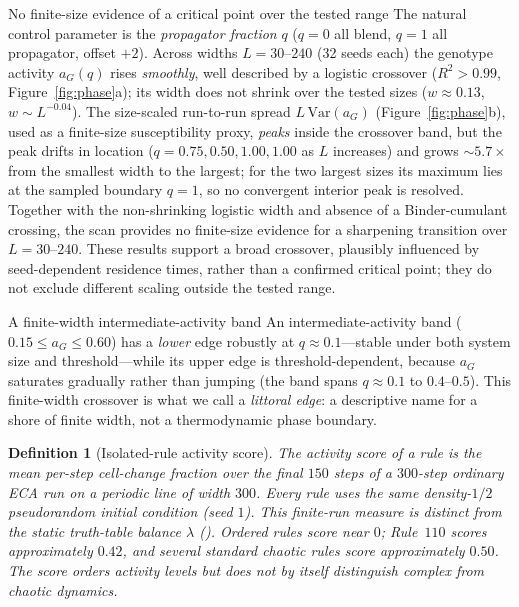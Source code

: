 \documentclass[man,12pt,floatsintext,donotrepeattitle]{apa7}
\newcommand{\secref}[1]{\emph{\nameref{#1}}}
\newtheorem{definition}{Definition}
\begin{document}
\begin{empiricalfinding}[label={find:crossover}]{No finite-size evidence of a critical point over the tested range}
The natural control parameter is the \emph{propagator fraction} $q$ ($q = 0$ all
blend, $q = 1$ all propagator, offset $+2$). Across widths $L = 30$--$240$ (32
seeds each) the genotype activity $a_G(q)$ rises \emph{smoothly}, well described
by a logistic crossover ($R^2 > 0.99$, Figure~\ref{fig:phase}a); its width does
not shrink over the tested sizes ($w \approx 0.13$, $w \sim L^{-0.04}$). The
size-scaled run-to-run spread $L\,\mathrm{Var}(a_G)$
(Figure~\ref{fig:phase}b), used as a finite-size susceptibility proxy,
\emph{peaks} inside the crossover band, but the peak drifts in location
($q=0.75,0.50,1.00,1.00$ as $L$ increases) and grows ${\sim}5.7\times$ from the
smallest width to the largest; for the two largest sizes its maximum lies at
the sampled boundary $q=1$, so no convergent interior peak is resolved. Together
with the non-shrinking logistic width and absence of a Binder-cumulant crossing,
the scan provides no finite-size evidence for a sharpening transition over
$L=30$--$240$. These results support a broad crossover, plausibly
influenced by seed-dependent residence times, rather than a confirmed critical
point; they do not exclude different scaling outside the tested range.
\end{empiricalfinding}

\begin{empiricalfinding}[label={find:littoral}]{A finite-width intermediate-activity band}
An intermediate-activity band ($0.15 \le a_G \le 0.60$) has a \emph{lower} edge
robustly at $q \approx 0.1$---stable under both system size and threshold---while
its upper edge is threshold-dependent, because $a_G$ saturates gradually rather
than jumping (the band spans $q \approx 0.1$ to $0.4$--$0.5$). This finite-width
crossover is what we call a \emph{littoral edge}: a descriptive name for a shore
of finite width, not a thermodynamic phase boundary.
\end{empiricalfinding}

\begin{definition}[Isolated-rule activity score]\label{def:activity}
The \emph{activity score} of a rule is the mean per-step cell-change fraction
over the final $150$ steps of a $300$-step ordinary ECA run on a periodic line
of width $300$. Every rule uses the same density-$1/2$ pseudorandom initial
condition (seed $1$). This finite-run measure is distinct from the static
truth-table balance $\lambda$ (\secref{sec:lambda}). Ordered rules score near
$0$; Rule~$110$ scores approximately $0.42$, and several standard chaotic rules
score approximately $0.50$. The score orders activity levels but does not by
itself distinguish complex from chaotic dynamics.
\end{definition}
\end{document}
